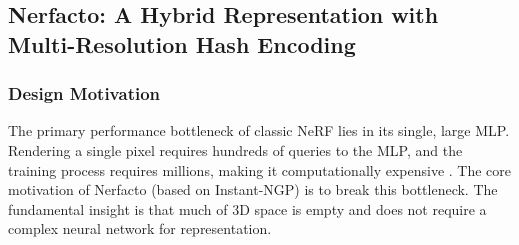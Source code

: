 \documentclass[11pt]{article}
\begin{document}
\subsection{Nerfacto: A Hybrid Representation with Multi-Resolution Hash Encoding}

\subsubsection{Design Motivation}
The primary performance bottleneck of classic NeRF lies in its single, large MLP. Rendering a single pixel requires hundreds of queries to the MLP, and the training process requires millions, making it computationally expensive \cite{muller2022instant_long}. The core motivation of Nerfacto (based on Instant-NGP) is to break this bottleneck. The fundamental insight is that much of 3D space is empty and does not require a complex neural network for representation.
\end{document}
